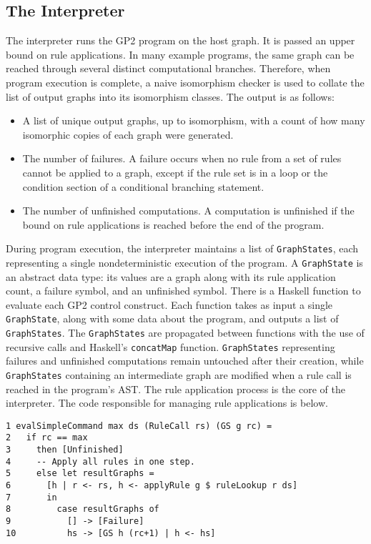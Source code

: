 \subsection{The Interpreter}

The interpreter runs the GP2 program on the host graph. It is passed an upper bound on rule applications. In many example programs, the same graph can be reached through several distinct computational branches. Therefore, when program execution is complete, a naive isomorphism checker is used to collate the list of output graphs into its isomorphism classes. The output is as follows:

\begin{itemize}
\item A list of unique output graphs, up to isomorphism, with a count of how many isomorphic copies of each graph were generated.
\item The number of failures. A failure occurs when no rule from a set of rules cannot be applied to a graph, except if the rule set is in a loop or the condition section of a conditional branching statement.
\item The number of unfinished computations. A computation is unfinished if the bound on rule applications is reached before the end of the program.
\end{itemize}

During program execution, the interpreter maintains a list of \texttt{GraphStates}, each representing a single nondeterministic execution of the program. A \texttt{GraphState} is an abstract data type: its values are a graph along with its rule application count, a failure symbol, and an unfinished symbol. There is a Haskell function to evaluate each GP2 control construct. Each function takes as input a single \texttt{GraphState}, along with some data about the program, and outputs a list of \texttt{GraphStates}. The \texttt{GraphStates} are propagated between functions with the use of recursive calls and Haskell's \texttt{concatMap} function. \texttt{GraphStates} representing failures and unfinished computations remain untouched after their creation, while \texttt{GraphStates} containing an intermediate graph are modified when a rule call is reached in the program's AST. The rule application process is the core of the interpreter. The code responsible for managing rule applications is below.

\begin{verbatim}
1 evalSimpleCommand max ds (RuleCall rs) (GS g rc) = 
2   if rc == max 
3     then [Unfinished]
4     -- Apply all rules in one step.
5     else let resultGraphs = 
6       [h | r <- rs, h <- applyRule g $ ruleLookup r ds] 
7       in
8         case resultGraphs of
9           [] -> [Failure]
10          hs -> [GS h (rc+1) | h <- hs]
\end{verbatim}

